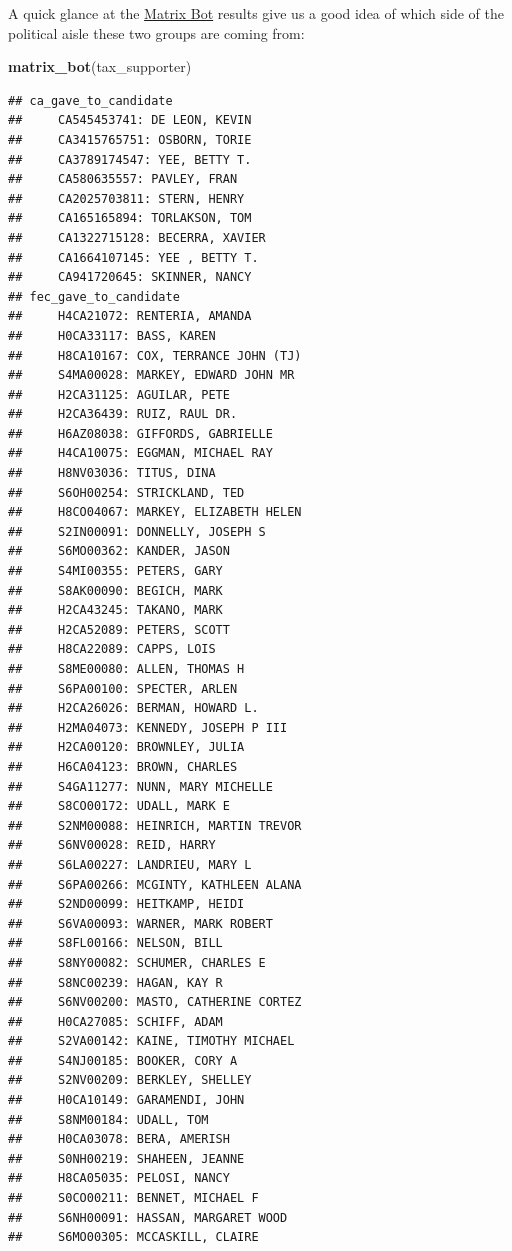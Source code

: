 \documentclass[]{book}
\newenvironment{Shaded}{\begin{snugshade}}{\end{snugshade}}
\newcommand{\KeywordTok}[1]{\textcolor[rgb]{0.13,0.29,0.53}{\textbf{#1}}}
\newcommand{\NormalTok}[1]{#1}
\begin{document}
A quick glance at the \protect\hyperlink{matrix-bot}{Matrix Bot} results give us a good idea of which side of the political aisle these two groups are coming from:

\begin{Shaded}
\begin{Highlighting}[]
\KeywordTok{matrix_bot}\NormalTok{(tax_supporter)}
\end{Highlighting}
\end{Shaded}

\begin{verbatim}
## ca_gave_to_candidate 
##     CA545453741: DE LEON, KEVIN
##     CA3415765751: OSBORN, TORIE
##     CA3789174547: YEE, BETTY T.
##     CA580635557: PAVLEY, FRAN
##     CA2025703811: STERN, HENRY
##     CA165165894: TORLAKSON, TOM
##     CA1322715128: BECERRA, XAVIER
##     CA1664107145: YEE , BETTY T.
##     CA941720645: SKINNER, NANCY
## fec_gave_to_candidate 
##     H4CA21072: RENTERIA, AMANDA
##     H0CA33117: BASS, KAREN
##     H8CA10167: COX, TERRANCE JOHN (TJ)
##     S4MA00028: MARKEY, EDWARD JOHN MR
##     H2CA31125: AGUILAR, PETE
##     H2CA36439: RUIZ, RAUL DR.
##     H6AZ08038: GIFFORDS, GABRIELLE
##     H4CA10075: EGGMAN, MICHAEL RAY
##     H8NV03036: TITUS, DINA
##     S6OH00254: STRICKLAND, TED
##     H8CO04067: MARKEY, ELIZABETH HELEN
##     S2IN00091: DONNELLY, JOSEPH S
##     S6MO00362: KANDER, JASON
##     S4MI00355: PETERS, GARY
##     S8AK00090: BEGICH, MARK
##     H2CA43245: TAKANO, MARK
##     H2CA52089: PETERS, SCOTT
##     H8CA22089: CAPPS, LOIS
##     S8ME00080: ALLEN, THOMAS H
##     S6PA00100: SPECTER, ARLEN
##     H2CA26026: BERMAN, HOWARD L.
##     H2MA04073: KENNEDY, JOSEPH P III
##     H2CA00120: BROWNLEY, JULIA
##     H6CA04123: BROWN, CHARLES
##     S4GA11277: NUNN, MARY MICHELLE
##     S8CO00172: UDALL, MARK E
##     S2NM00088: HEINRICH, MARTIN TREVOR
##     S6NV00028: REID, HARRY
##     S6LA00227: LANDRIEU, MARY L
##     S6PA00266: MCGINTY, KATHLEEN ALANA
##     S2ND00099: HEITKAMP, HEIDI
##     S6VA00093: WARNER, MARK ROBERT
##     S8FL00166: NELSON, BILL
##     S8NY00082: SCHUMER, CHARLES E
##     S8NC00239: HAGAN, KAY R
##     S6NV00200: MASTO, CATHERINE CORTEZ
##     H0CA27085: SCHIFF, ADAM
##     S2VA00142: KAINE, TIMOTHY MICHAEL
##     S4NJ00185: BOOKER, CORY A
##     S2NV00209: BERKLEY, SHELLEY
##     H0CA10149: GARAMENDI, JOHN
##     S8NM00184: UDALL, TOM
##     H0CA03078: BERA, AMERISH
##     S0NH00219: SHAHEEN, JEANNE
##     H8CA05035: PELOSI, NANCY
##     S0CO00211: BENNET, MICHAEL F
##     S6NH00091: HASSAN, MARGARET WOOD
##     S6MO00305: MCCASKILL, CLAIRE

\end{verbatim}
\end{document}
